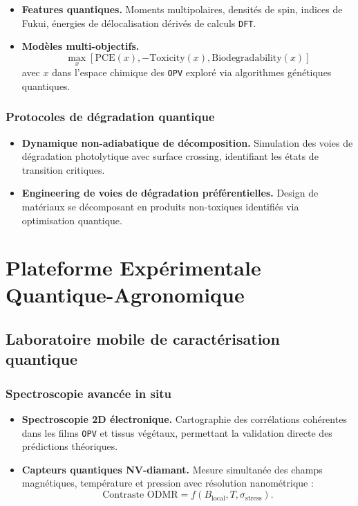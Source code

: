 \documentclass[12pt, a4paper]{article}
\begin{document}
\begin{itemize}
    \item \textbf{Features quantiques.} Moments multipolaires, densités de spin, indices de Fukui, énergies de délocalisation dérivés de calculs \texttt{DFT}.
    
    \item \textbf{Modèles multi-objectifs.}
    \begin{equation}
    \max_{x} [\text{PCE}(x), -\text{Toxicity}(x), \text{Biodegradability}(x)]
    \end{equation}
    avec $x$ dans l'espace chimique des \texttt{OPV} exploré via algorithmes génétiques quantiques.
\end{itemize}

\subsubsection{Protocoles de dégradation quantique}

\begin{itemize}
    \item \textbf{Dynamique non-adiabatique de décomposition.} Simulation des voies de dégradation photolytique avec surface crossing, identifiant les états de transition critiques.
    
    \item \textbf{Engineering de voies de dégradation préférentielles.} Design de matériaux se décomposant en produits non-toxiques identifiés via optimisation quantique.
\end{itemize}

\section{Plateforme Expérimentale Quantique-Agronomique}

\subsection{Laboratoire mobile de caractérisation quantique}

\subsubsection{Spectroscopie avancée in situ}

\begin{itemize}
    \item \textbf{Spectroscopie 2D électronique.} Cartographie des corrélations cohérentes dans les films \texttt{OPV} et tissus végétaux, permettant la validation directe des prédictions théoriques.
    
    \item \textbf{Capteurs quantiques NV-diamant.} Mesure simultanée des champs magnétiques, température et pression avec résolution nanométrique :
    \begin{equation}
    \text{Contraste ODMR} = f(B_{\text{local}}, T, \sigma_{\text{stress}}).
    \end{equation}
\end{itemize}
\end{document}
